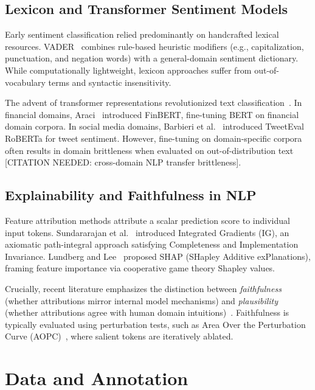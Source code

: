 \documentclass[10pt,twocolumn,letterpaper]{article}
\begin{document}
\subsection{Lexicon and Transformer Sentiment Models}
Early sentiment classification relied predominantly on handcrafted lexical resources. VADER~\cite{hutto2014vader} combines rule-based heuristic modifiers (e.g., capitalization, punctuation, and negation words) with a general-domain sentiment dictionary. While computationally lightweight, lexicon approaches suffer from out-of-vocabulary terms and syntactic insensitivity.

The advent of transformer representations revolutionized text classification~\cite{liu2019roberta,sanh2019distilbert}. In financial domains, Araci~\cite{araci2019finbert} introduced FinBERT, fine-tuning BERT on financial domain corpora. In social media domains, Barbieri et al.~\cite{barbieri2020tweeteval} introduced TweetEval RoBERTa for tweet sentiment. However, fine-tuning on domain-specific corpora often results in domain brittleness when evaluated on out-of-distribution text [CITATION NEEDED: cross-domain NLP transfer brittleness].

\subsection{Explainability and Faithfulness in NLP}
Feature attribution methods attribute a scalar prediction score to individual input tokens. Sundararajan et al.~\cite{sundararajan2017axiomatic} introduced Integrated Gradients (IG), an axiomatic path-integral approach satisfying Completeness and Implementation Invariance. Lundberg and Lee~\cite{lundberg2017unified} proposed SHAP (SHapley Additive exPlanations), framing feature importance via cooperative game theory Shapley values.

Crucially, recent literature emphasizes the distinction between \textit{faithfulness} (whether attributions mirror internal model mechanisms) and \textit{plausibility} (whether attributions agree with human domain intuitions)~\cite{deyoung2020eraser}. Faithfulness is typically evaluated using perturbation tests, such as Area Over the Perturbation Curve (AOPC)~\cite{samek2017evaluating,petsiuk2018rise}, where salient tokens are iteratively ablated.

\section{Data and Annotation}
\end{document}

